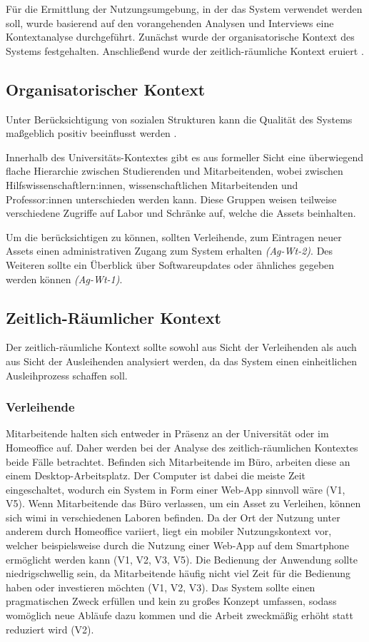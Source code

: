 Für die Ermittlung der Nutzungsumgebung, in der das System verwendet werden
soll, wurde basierend auf den vorangehenden Analysen und Interviews eine
Kontextanalyse durchgeführt. Zunächst wurde der organisatorische Kontext des
Systems festgehalten. Anschließend wurde der zeitlich-räumliche Kontext eruiert
\cite{HerczegSoftEg2018}.

\subsection{Organisatorischer Kontext}
Unter Berücksichtigung von sozialen Strukturen kann die Qualität des Systems
maßgeblich positiv beeinflusst werden \cite{HerczegSoftEg2018}.

Innerhalb des Universitäts-Kontextes gibt es aus formeller Sicht eine
überwiegend flache Hierarchie zwischen Studierenden und Mitarbeitenden, wobei
zwischen Hilfswissenschaftlern:innen, wissenschaftlichen Mitarbeitenden und
Professor:innen unterschieden werden kann. Diese Gruppen weisen teilweise
verschiedene Zugriffe auf Labor und Schränke auf, welche die Assets beinhalten.

Um die  berücksichtigen zu können, sollten Verleihende,
zum Eintragen neuer Assets einen administrativen Zugang zum System erhalten
\textit{(Ag-Wt-2)}. Des Weiteren sollte ein Überblick über Softwareupdates oder
ähnliches gegeben werden können \textit{(Ag-Wt-1)}.


\subsection{Zeitlich-Räumlicher Kontext}
\label{section:zeit}
Der zeitlich-räumliche Kontext sollte sowohl aus Sicht der Verleihenden als auch
aus Sicht der Ausleihenden analysiert werden, da das System einen einheitlichen
Ausleihprozess schaffen soll.

\subsubsection{Verleihende}
Mitarbeitende halten sich entweder in Präsenz an der Universität oder im
Homeoffice auf. Daher werden bei der Analyse des zeitlich-räumlichen Kontextes
beide Fälle betrachtet. Befinden sich Mitarbeitende im Büro, arbeiten diese an
einem Desktop-Arbeitsplatz. Der Computer ist dabei die meiste Zeit
eingeschaltet, wodurch ein System in Form einer Web-App sinnvoll wäre (V1, V5).
Wenn Mitarbeitende das Büro verlassen, um ein Asset zu Verleihen, können sich
\ac{wimi} in verschiedenen Laboren befinden. Da der Ort der Nutzung unter
anderem durch Homeoffice variiert, liegt ein mobiler Nutzungskontext vor,
welcher beispielsweise durch die Nutzung einer Web-App auf dem Smartphone
ermöglicht werden kann (V1, V2, V3, V5). Die Bedienung der Anwendung sollte
niedrigschwellig sein, da Mitarbeitende häufig nicht viel Zeit für die Bedienung
haben oder investieren möchten (V1, V2, V3). Das System sollte einen
pragmatischen Zweck erfüllen und kein zu großes Konzept umfassen, sodass
womöglich neue Abläufe dazu kommen und die Arbeit zweckmäßig erhöht statt
reduziert wird (V2).

